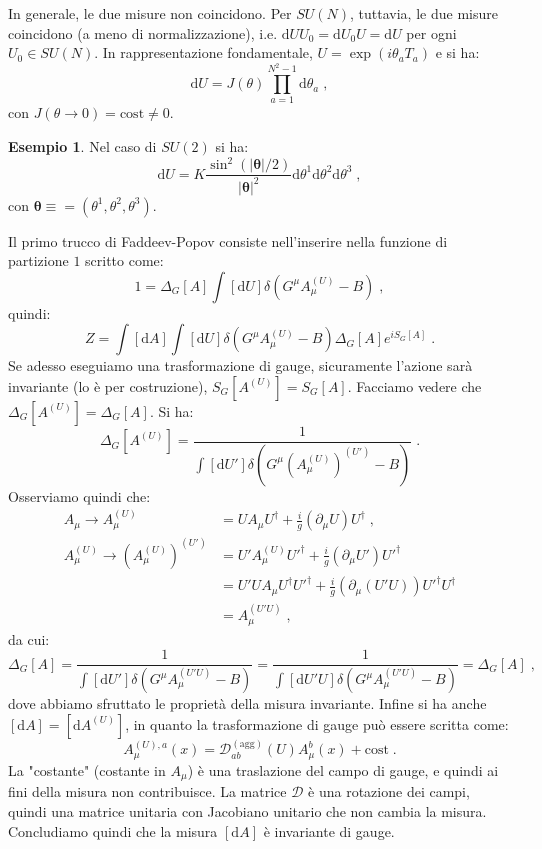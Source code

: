 \documentclass[12pt,a4paper]{article}
\theoremstyle{definition}
\newtheorem{exm}{Esempio}
\newcommand{\diff}[1][]{\mathrm{d}#1}
\newcommand{\adj}[1]{#1^{\dagger}}
\numberwithin{equation}{section}
\begin{document}
In generale, le due misure non coincidono. Per $SU(N)$, tuttavia, le due misure coincidono (a meno di normalizzazione), i.e. $\diff{UU_0}=\diff{U_0U}=\diff{U}$ per ogni $U_0\in SU(N)$. In rappresentazione fondamentale, $U=\exp(i\theta_aT_a)$ e si ha:
\begin{equation}
\diff{U}=J(\theta)\prod_{a=1}^{N^2-1}\diff{\theta_a}\;,
\end{equation}
con $J(\theta\to 0)=\mathrm{cost}\ne 0$.
\begin{exm}
Nel caso di $SU(2)$ si ha:
$$
\diff{U}=K\frac{\sin^2(|\boldsymbol{\theta}|/2)}{|\boldsymbol{\theta}|^2}\diff{\theta}^1\diff{\theta}^2\diff{\theta}^3\;,
$$
con $\boldsymbol{\theta}\equiv=(\theta^1,\theta^2,\theta^3)$.
\end{exm}
Il primo trucco di Faddeev-Popov consiste nell'inserire nella funzione di partizione $1$ scritto come:
$$
1=\Delta_G[A]\int[\diff{U}]\delta\left(G^{\mu}A_{\mu}^{(U)}-B\right)\;,
$$
quindi:
\begin{equation}
Z=\int[\diff{A}]\int[\diff{U}]\delta\left(G^{\mu}A_{\mu}^{(U)}-B\right)\Delta_G[A]e^{iS_G[A]}\;.
\end{equation}
Se adesso eseguiamo una trasformazione di gauge, sicuramente l'azione sarà invariante (lo è per costruzione), $S_G[A^{(U)}]=S_G[A]$. Facciamo vedere che $\Delta_G[A^{(U)}]=\Delta_G[A]$. Si ha:
$$
\Delta_G[A^{(U)}]=\frac{1}{\int[\diff{U}']\delta\left(G^{\mu}(A_{\mu}^{(U)})^{(U')}-B\right)}\;.
$$
Osserviamo quindi che:
\begin{align*}
A_{\mu}\longrightarrow A_{\mu}^{(U)}&=UA_{\mu}\adj{U}+\frac{i}{g}(\partial_{\mu}U)\adj{U}\;, \\
A_{\mu}^{(U)}\longrightarrow \left(A_{\mu}^{(U)}\right)^{(U')}&=U'A_{\mu}^{(U)}\adj{U'}+\frac{i}{g}(\partial_{\mu}U')\adj{U'} \\
&= U'UA_{\mu}\adj{U}\adj{U'}+\frac{i}{g}(\partial_{\mu}(U'U))\adj{U'}\adj{U}\\
&=A_{\mu}^{(U'U)}\;,
\end{align*}
da cui:
$$
\Delta_G[A]=\frac{1}{\int[\diff{U'}]\delta\left(G^{\mu}A_{\mu}^{(U'U)}-B\right)}=\frac{1}{\int[\diff{U'U}]\delta\left(G^{\mu}A_{\mu}^{(U'U)}-B\right)}=\Delta_G[A]\;,
$$
dove abbiamo sfruttato le proprietà della misura invariante. Infine si ha anche $[\diff{A}]=[\diff{A}^{(U)}]$, in quanto la trasformazione di gauge può essere scritta come:
$$
A_{\mu}^{(U),a}(x)=\mathcal{D}_{ab}^{(\mathrm{agg})}(U)A_{\mu}^b(x)+\mathrm{cost}\;.
$$
La "costante" (costante in $A_{\mu}$) è una traslazione del campo di gauge, e quindi ai fini della misura non contribuisce. La matrice $\mathcal{D}$ è una rotazione dei campi, quindi una matrice unitaria con Jacobiano unitario che non cambia la misura. Concludiamo quindi che la misura $[\diff{A}]$ è invariante di gauge. \\
\end{document}
